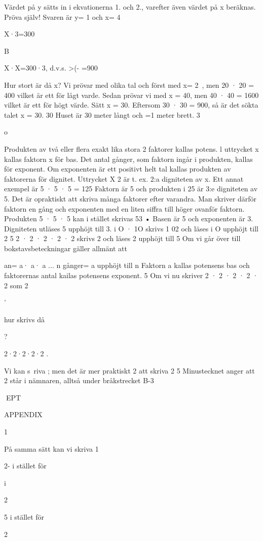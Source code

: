 \documentclass[a4paper,twoside,twocolumn,openright]{book}
\begin{document}
{{{{{{Värdet på y sätts in i ekvationerna 1. och
2., varefter även värdet på x beräknas.
Pröva själv! Svaren är y= 1 och x= 4

X·3=300

B

X·X=300·3, d.v.s. >(- =900

Hur stort är då x?
Vi prövar med olika tal och först med x=
2~, men 20 · 20 = 400 vilket är ett för lågt
varde. Sedan prövar vi med x = 40, men 40
· 40 = 1600 vilket är ett för högt värde. Sätt x
= 30. Eftersom 30 · 30 = 900, så är det sökta
talet x = 30.
30
Huset är 30 meter långt och
=1
meter brett.
3

o

Produkten av två eller flera exakt lika stora
2
faktorer kallas potens. l uttrycket x kallas
faktorn x för bas. Det antal gånger, som
faktorn ingår i produkten, kallas för exponent. Om exponenten är ett positivt helt tal
kallas produkten av faktorerna för dignitet.
Uttrycket X 2 är t. ex. 2:a digniteten av x.
Ett annat exempel är 5 · 5 · 5 = 125
Faktorn är 5 och produkten i 25 är 3:e digniteten av 5.
Det är opraktiskt att skriva många faktorer efter varandra. Man skriver därför faktorn
en gång och exponenten med en liten siffra
till höger ovanför faktorn.
Produkten 5 · 5 · 5 kan i stället skrivas 53 •
Basen är 5 och exponenten är 3. Digniteten
utläses 5 upphöjt till 3.
i O · 1O skrivs 1 02 och läses i O upphöjt till 2
5
2 · 2 · 2 · 2 · 2 skrivs 2 och läses 2 upphöjt
till 5
Om vi går över till bokstavsbeteckningar
gäller allmänt att

an= a· a· a ... n gånger= a upphöjt till n
Faktorn a kallas potensens bas och faktorernas antal kailas potensens exponent.
5
Om vi nu skriver 2 · 2 · 2 · 2 · 2 som 2

'

hur skrivs då

?

2·2·2·2·2 .

Vi kan s~riva ; men det är mer praktiskt
2
att skriva 2
5
Minustecknet anger att 2 står i nämnaren, alltså under bråkstrecket
B-3

EPT

APPENDIX

1

På samma sätt kan vi skriva
1

2- i stället för

i

2

5 i stället för

2

}}}}}}
\end{document}
